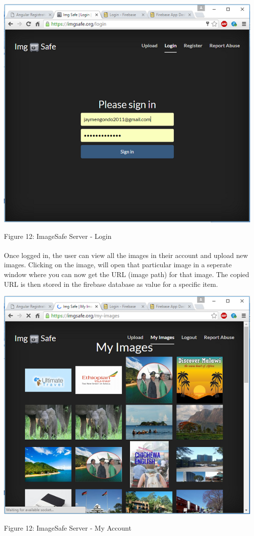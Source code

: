 \begin{center}    
	\includegraphics{img/imgsafe2.png}
\end{center}
\begin{center}
	Figure 12: ImageSafe Server - Login
\end{center}
\paragraph{}

Once logged in, the user can view all the images in their account and upload new images. Clicking on the image, will open that particular image in a seperate window where you can now get the URL (image path) for that image. The copied URL is then stored in the firebase database as value for a specific item.

\begin{center}    
	\includegraphics{img/imgsafe.png}
\end{center}
\begin{center}
	Figure 12: ImageSafe Server - My Account
\end{center}
